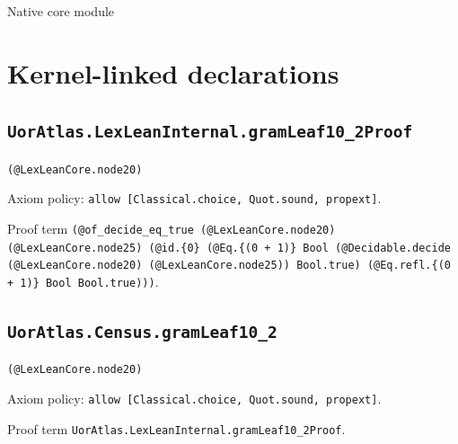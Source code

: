 \documentclass[11pt]{article}
\begin{document}
\begin{center}{\LARGE Native core module}\end{center}
\section*{Kernel-linked declarations}
\subsection*{\texttt{UorAtlas.LexLeanInternal.gramLeaf10\_2Proof}}
\noindent\texttt{(@LexLeanCore.node20)}\par
\noindent Axiom policy: \texttt{allow [Classical.choice, Quot.sound, propext]}.\par
\noindent Proof term \texttt{(@of\_decide\_eq\_true (@LexLeanCore.node20) (@LexLeanCore.node25) (@id.\{0\} (@Eq.\{(0 + 1)\} Bool (@Decidable.decide (@LexLeanCore.node20) (@LexLeanCore.node25)) Bool.true) (@Eq.refl.\{(0 + 1)\} Bool Bool.true)))}.\par
\subsection*{\texttt{UorAtlas.Census.gramLeaf10\_2}}
\noindent\texttt{(@LexLeanCore.node20)}\par
\noindent Axiom policy: \texttt{allow [Classical.choice, Quot.sound, propext]}.\par
\noindent Proof term \texttt{UorAtlas.LexLeanInternal.gramLeaf10\_2Proof}.\par
\end{document}
